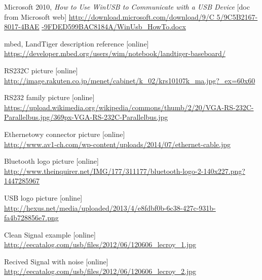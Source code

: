 \documentclass{BscUS}
\begin{document}
\begin{thebibliography}{1}
 Microsoft 2010, {\em How to Use WinUSB to Communicate with a USB Device} [doc from Microsoft web]
\newline 
\url{http://download.microsoft.com/download/9/C 5/9C5B2167-8017-4BAE} 
\newline 
\url{-9FDED599BAC8184A/WinUsb_HowTo.docx}

 mbed, LandTiger description reference [online]
\newline 
\url{https://developer.mbed.org/users/wim/notebook/landtiger-baseboard/}

 RS232C picture [online]
\newline
\url{http://image.rakuten.co.jp/menet/cabinet/k_02/krs10107k_ma.jpg?_ex=60x60}

 RS232 family picture [online]
\newline
\url{https://upload.wikimedia.org/wikipedia/commons/thumb/2/20/VGA-RS-232C-Parallelbus.jpg/369px-VGA-RS-232C-Parallelbus.jpg}

 Ethernetowy connector picture [online] \\
\url{http://www.av1-ch.com/wp-content/uploads/2014/07/ethernet-cable.jpg}

 Bluetooth logo picture [online] \\
\url{http://www.theinquirer.net/IMG/177/311177/bluetooth-logo-2-140x227.png?1447285967}

 USB logo picture [online] \\
\url{http://hexus.net/media/uploaded/2013/4/e8fdbf0b-6c38-427c-931b-fa4b728856e7.png}

 Clean Signal example [online] \\
\url{http://eecatalog.com/usb/files/2012/06/120606_lecroy_1.jpg}

 Recived Signal with noise [online] \\
\url{http://eecatalog.com/usb/files/2012/06/120606_lecroy_2.jpg}


\end{thebibliography}
\end{document}
